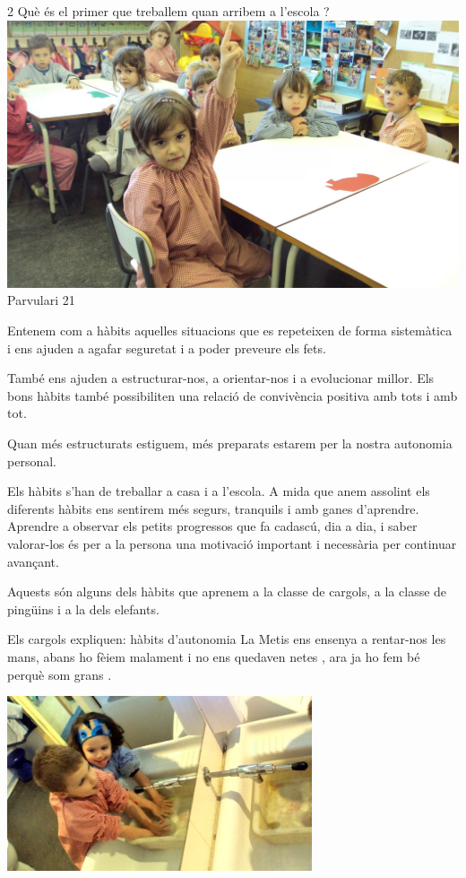 \begin{news}
{2} %
{Què és el primer que treballem quan arribem a l’escola ?}
{\noindent\includegraphics[width=18cm,keepaspectratio]{parvulari/img/foto3b.jpg}}
{Parvulari}
{21} %

Entenem com a hàbits aquelles situacions que es repeteixen de forma sistemàtica i ens ajuden a agafar seguretat i a poder preveure els fets.

També ens ajuden a estructurar-nos, a orientar-nos i a evolucionar millor.
Els bons hàbits també possibiliten una relació de convivència positiva amb tots i amb tot.

Quan més estructurats estiguem, més preparats estarem per la nostra autonomia personal. 

Els hàbits s’han de treballar a casa i a l’escola. A mida que anem assolint els diferents hàbits ens sentirem més segurs, tranquils i amb ganes d’aprendre.
Aprendre a observar els petits progressos que fa cadascú, dia a dia,  i saber valorar-los és per a la persona  una motivació important i necessària per continuar avançant.

Aquests  són alguns dels hàbits que aprenem a la classe de cargols, a la classe de pingüins i a la dels elefants.

Els cargols expliquen: hàbits d’autonomia
La Metis ens ensenya a rentar-nos les mans, abans ho fèiem  malament i no ens quedaven netes , ara ja ho fem bé perquè som grans .


\noindent\includegraphics[width=9cm,keepaspectratio]{parvulari/img/foto1b.jpg}


\end{news}
